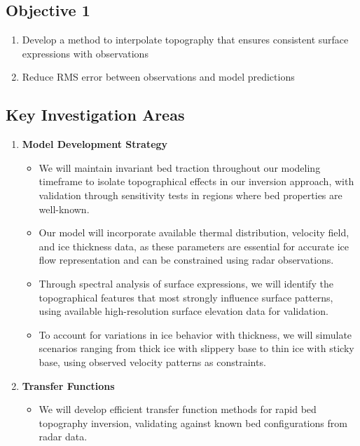 \subsection*{Objective 1}
\begin{enumerate}
\item Develop a method to interpolate topography that ensures consistent surface expressions with observations
\item Reduce RMS error between observations and model predictions
\end{enumerate}

\subsection*{Key Investigation Areas}
\begin{enumerate}
\item\textbf{Model Development Strategy}
    \begin{itemize}
    \item We will maintain invariant bed traction throughout our modeling timeframe to isolate topographical effects in our inversion approach, with validation through sensitivity tests in regions where bed properties are well-known.
    
    \item Our model will incorporate available thermal distribution, velocity field, and ice thickness data, as these parameters are essential for accurate ice flow representation and can be constrained using radar observations.
    
    \item Through spectral analysis of surface expressions, we will identify the topographical features that most strongly influence surface patterns, using available high-resolution surface elevation data for validation.
    
    \item To account for variations in ice behavior with thickness, we will simulate scenarios ranging from thick ice with slippery base to thin ice with sticky base, using observed velocity patterns as constraints.
    \end{itemize}

\item\textbf{Transfer Functions}
    \begin{itemize}
    \item We will develop efficient transfer function methods for rapid bed topography inversion, validating against known bed configurations from radar data.
    

\end{itemize}
\end{enumerate}
